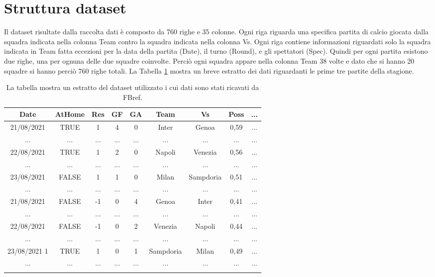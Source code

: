 \section{Struttura dataset}
Il dataset risultate dalla raccolta dati è composto da 760 righe e 35 colonne. Ogni riga riguarda una specifica partita di calcio giocata dalla squadra indicata nella colonna \textsf{Team} contro la squadra indicata nella colonna \textsf{Vs}. Ogni riga contiene informazioni riguardati solo la squadra indicata in \textsf{Team} fatta eccezioni per la data della partita (\textsf{Date}), il turno (\textsf{Round}), e gli spettatori (\textsf{Spec}). Quindi per ogni partita esistono due righe, una per ognuna delle due squadre coinvolte. Perciò ogni squadra appare nella colonna \textsf{Team} 38 volte e dato che si hanno 20 squadre si hanno perciò 760 righe totali. %
La Tabella \ref{tab:db} mostra un breve estratto dei dati riguardanti le prime tre partite della stagione. 
	\begin{table}[!ht]%

	\renewcommand{\arraystretch}{1.7}
	\centering
	\begin{tabular}{c c c c c c c c c  }
		\hline	

		\textbf{Date} & \textbf{AtHome} & \textbf{Res} & \textbf{GF} & \textbf{GA} & \textbf{Team} & \textbf{Vs} & \textbf{Poss} & \textbf{...}   \\	
		\hline	
		21/08/2021 & TRUE & 1 & 4 & 0 & Inter & Genoa & 0,59 & ... \\
		... & ... & ... & ... & ... & ... & ... & ... & ... \\
		22/08/2021  & TRUE & 1 & 2 & 0 & Napoli & Venezia & 0,56 & ... \\
		... & ... & ... & ... & ... & ... & ... & ... & ...  \\
		23/08/2021  & FALSE & 1 & 1 & 0 & Milan & Sampdoria & 0,51 & ... \\		
		... & ... & ... & ... & ... & ... & ... & ... & ... \\
		21/08/2021  & FALSE & -1 & 0 & 4 & Genoa & Inter & 0,41 & ... \\
		... & ... & ... & ... & ... & ... & ... & ... & ...  \\
		22/08/2021  & FALSE & -1 & 0 & 2 & Venezia & Napoli & 0,44 & ... \\
		... & ... & ... & ... & ... & ... & ... & ... & ...  \\
		23/08/2021 1 & TRUE & 1 & 0 & 1 & Sampdoria & Milan & 0,49 & ... \\
		... & ... & ... & ... & ... & ... & ... & ... & ...  \\
		\hline
		& & & & & & & & \\
		
		
		
	\end{tabular} \hbox{}
	
	\caption{La tabella mostra un estratto del dataset utilizzato i cui dati sono stati ricavati da FBref.} \label{tab:db}
\end{table}

